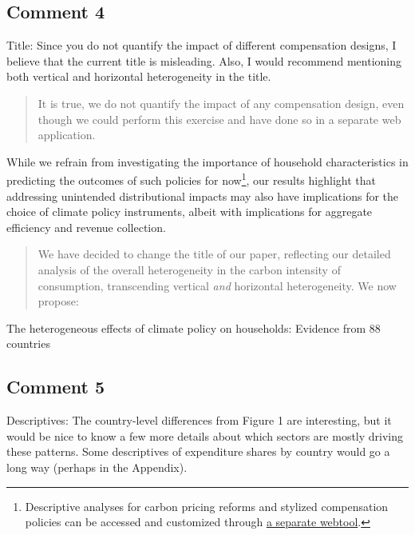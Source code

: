 \documentclass[11pt]{article}
\newenvironment{response}
{\begin{quote}\color{black}}
{\end{quote}}
\begin{document}
\subsection*{Comment 4}\label{comment_R2_4}

\begin{commentbox}
    Title: Since you do not quantify the impact of different compensation designs, I believe that the current title is misleading. Also, I would recommend mentioning both vertical and horizontal heterogeneity in the title.
\end{commentbox}

\begin{response}
    It is true, we do not quantify the impact of any compensation design, even though we could perform this exercise and have done so in a separate web application. 
\end{response}

\begin{revisionbox}
    While we refrain from investigating the importance of household characteristics in predicting the outcomes of such policies for now\footnote{Descriptive analyses for carbon pricing reforms and stylized compensation policies can be accessed and customized through \href{https://www.cpic-global.net/}{a separate webtool}.}, our results highlight that addressing unintended distributional impacts may also have implications for the choice of climate policy instruments, albeit with implications for aggregate efficiency and revenue collection. 
\end{revisionbox}

\begin{response}
    We have decided to change the title of our paper, reflecting our detailed analysis of the overall heterogeneity in the carbon intensity of consumption, transcending vertical \textit{and} horizontal heterogeneity. We now propose:
\end{response}

\begin{revisionbox}
    The heterogeneous effects of climate policy on households: Evidence from 88 countries
\end{revisionbox}

\subsection*{Comment 5}\label{comment_R2_5}

\begin{commentbox}
    Descriptives: The country-level differences from Figure 1 are interesting, but it would be nice to know a few more details about which sectors are mostly driving these patterns. Some descriptives of expenditure shares by country would go a long way (perhaps in the Appendix).
\end{commentbox}
\end{document}
